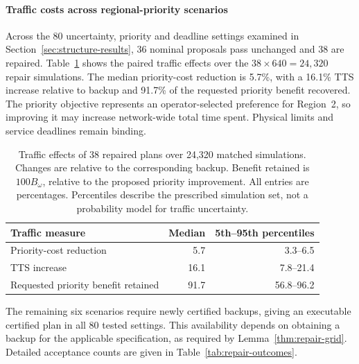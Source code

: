 \documentclass[final]{cas-sc}
\theoremstyle{definition}
\theoremstyle{plain}
\theoremstyle{definition}
\theoremstyle{plain}
\begin{document}
\paragraph{Traffic costs across regional-priority scenarios}
Across the 80 uncertainty, priority and deadline settings examined in
Section~\ref{sec:structure-results}, 36 nominal proposals pass unchanged
and 38 are repaired. Table~\ref{tab:repair-traffic-tradeoffs} shows the
paired traffic effects over the $38\times640=24{,}320$ repair simulations.
The median priority-cost reduction is 5.7\%, with a 16.1\% TTS increase
relative to backup and 91.7\% of the requested priority benefit
recovered. The priority objective represents an operator-selected
preference for Region~2, so improving it may increase network-wide
total time spent. Physical limits and service deadlines remain binding.
\begin{table}[pos=!htb]
\centering\small
\caption{Traffic effects of 38 repaired plans over 24,320 matched
simulations. Changes are relative to the corresponding backup. Benefit
retained is $100B_\omega$, relative to the proposed priority improvement.
All entries are percentages. Percentiles describe the prescribed
simulation set, not a probability model for traffic uncertainty.}
\label{tab:repair-traffic-tradeoffs}
\begin{tabularx}{\linewidth}{@{}Xrr@{}}
\toprule
Traffic measure & Median & 5th--95th percentiles\\
\midrule
Priority-cost reduction & 5.7 & 3.3--6.5\\
TTS increase & 16.1 & 7.8--21.4\\
Requested priority benefit retained & 91.7 & 56.8--96.2\\
\bottomrule
\end{tabularx}
\end{table}

The remaining six scenarios require newly certified backups, giving
an executable certified plan in all 80 tested settings. This availability
depends on obtaining a backup for the applicable specification, as
required by Lemma~\ref{thm:repair-grid}. Detailed acceptance counts are
given in Table~\ref{tab:repair-outcomes}.
\end{document}
